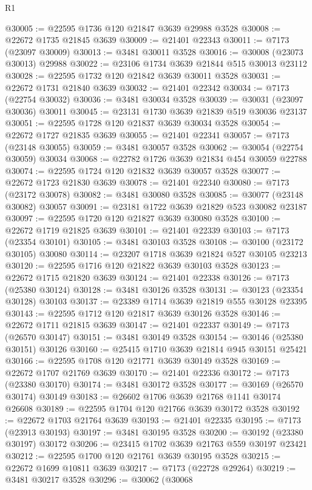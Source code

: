 \begin{lexlean}{R1}
\begin{coremodule}
@30005 := @22595 @1736 @120 @21847 @3639 @29988 @3528
@30008 := @22672 @1735 @21845 @3639
@30009 := @21401 @22343
@30011 := @7173 (@23097 @30009)
@30013 := @3481 @30011 @3528
@30016 := @30008 (@23073 @30013) @29988
@30022 := @23106 @1734 @3639 @21844 @515 @30013 @23112
@30028 := @22595 @1732 @120 @21842 @3639 @30011 @3528
@30031 := @22672 @1731 @21840 @3639
@30032 := @21401 @22342
@30034 := @7173 (@22754 @30032)
@30036 := @3481 @30034 @3528
@30039 := @30031 (@23097 @30036) @30011
@30045 := @23131 @1730 @3639 @21839 @519 @30036 @23137
@30051 := @22595 @1728 @120 @21837 @3639 @30034 @3528
@30054 := @22672 @1727 @21835 @3639
@30055 := @21401 @22341
@30057 := @7173 (@23148 @30055)
@30059 := @3481 @30057 @3528
@30062 := @30054 (@22754 @30059) @30034
@30068 := @22782 @1726 @3639 @21834 @454 @30059 @22788
@30074 := @22595 @1724 @120 @21832 @3639 @30057 @3528
@30077 := @22672 @1723 @21830 @3639
@30078 := @21401 @22340
@30080 := @7173 (@23172 @30078)
@30082 := @3481 @30080 @3528
@30085 := @30077 (@23148 @30082) @30057
@30091 := @23181 @1722 @3639 @21829 @523 @30082 @23187
@30097 := @22595 @1720 @120 @21827 @3639 @30080 @3528
@30100 := @22672 @1719 @21825 @3639
@30101 := @21401 @22339
@30103 := @7173 (@23354 @30101)
@30105 := @3481 @30103 @3528
@30108 := @30100 (@23172 @30105) @30080
@30114 := @23207 @1718 @3639 @21824 @527 @30105 @23213
@30120 := @22595 @1716 @120 @21822 @3639 @30103 @3528
@30123 := @22672 @1715 @21820 @3639
@30124 := @21401 @22338
@30126 := @7173 (@25380 @30124)
@30128 := @3481 @30126 @3528
@30131 := @30123 (@23354 @30128) @30103
@30137 := @23389 @1714 @3639 @21819 @555 @30128 @23395
@30143 := @22595 @1712 @120 @21817 @3639 @30126 @3528
@30146 := @22672 @1711 @21815 @3639
@30147 := @21401 @22337
@30149 := @7173 (@26570 @30147)
@30151 := @3481 @30149 @3528
@30154 := @30146 (@25380 @30151) @30126
@30160 := @25415 @1710 @3639 @21814 @945 @30151 @25421
@30166 := @22595 @1708 @120 @21771 @3639 @30149 @3528
@30169 := @22672 @1707 @21769 @3639
@30170 := @21401 @22336
@30172 := @7173 (@23380 @30170)
@30174 := @3481 @30172 @3528
@30177 := @30169 (@26570 @30174) @30149
@30183 := @26602 @1706 @3639 @21768 @1141 @30174 @26608
@30189 := @22595 @1704 @120 @21766 @3639 @30172 @3528
@30192 := @22672 @1703 @21764 @3639
@30193 := @21401 @22335
@30195 := @7173 (@23913 @30193)
@30197 := @3481 @30195 @3528
@30200 := @30192 (@23380 @30197) @30172
@30206 := @23415 @1702 @3639 @21763 @559 @30197 @23421
@30212 := @22595 @1700 @120 @21761 @3639 @30195 @3528
@30215 := @22672 @1699 @10811 @3639
@30217 := @7173 (@22728 @29264)
@30219 := @3481 @30217 @3528
@30296 := @30062
    (@30068

\end{coremodule}
\end{lexlean}
